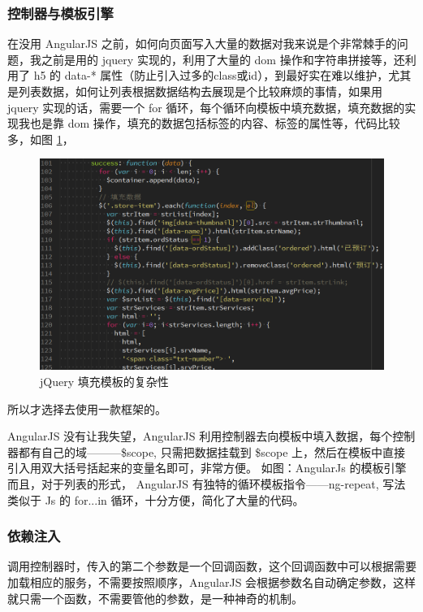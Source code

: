             \subsubsection{控制器与模板引擎}
              \label{subsubsec:控制器与模板引擎}
                在没用 AngularJS 之前，如何向页面写入大量的数据对我来说是个非常棘手的问题，我之前是用的 jquery 实现的，利用了大量的 dom 操作和字符串拼接等，还利用了 h5 的 data-* 属性（防止引入过多的class或id），到最好实在难以维护，尤其是列表数据，如何让列表根据数据结构去展现是个比较麻烦的事情，如果用 jquery 实现的话，需要一个 for 循环，每个循环向模板中填充数据，填充数据的实现我也是靠 dom 操作，填充的数据包括标签的内容、标签的属性等，代码比较多，如图 \ref{fig:cmplx_jq_tpl}，
                \begin{figure}[H]
                  \centering
                  \includegraphics[width=12cm]{./img/cmplx_jq_tpl.png}
                  \caption{jQuery 填充模板的复杂性}
                  \label{fig:cmplx_jq_tpl}
                \end{figure}
                所以才选择去使用一款框架的。
                \par
                AngularJS 没有让我失望，AngularJS 利用控制器去向模板中填入数据，每个控制器都有自己的域———\$scope, 只需把数据挂载到 \$scope 上，然后在模板中直接引入用双大括号括起来的变量名即可，非常方便。
                如图：AngularJs 的模板引擎
                而且，对于列表的形式， AngularJS 有独特的循环模板指令——ng-repeat, 写法类似于 Js 的 for...in 循环，十分方便，简化了大量的代码。

            \subsubsection{依赖注入}
              \label{subsubsec:依赖注入}
                调用控制器时，传入的第二个参数是一个回调函数，这个回调函数中可以根据需要加载相应的服务，不需要按照顺序，AngularJS 会根据参数名自动确定参数，这样就只需一个函数，不需要管他的参数，是一种神奇的机制。


